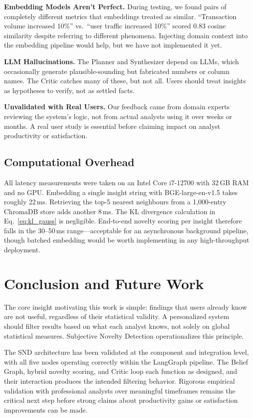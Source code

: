 \documentclass[conference]{IEEEtran}
\begin{document}
\textbf{Embedding Models Aren't Perfect.} During testing, we found pairs
of completely different metrics that embeddings treated as similar.
``Transaction volume increased 10\%'' vs.\ ``user traffic increased
10\%'' scored 0.83 cosine similarity despite referring to different
phenomena. Injecting domain context into the embedding pipeline
would help, but we have not implemented it yet.

\textbf{LLM Hallucinations.} The Planner and Synthesizer depend on LLMs,
which occasionally generate plausible-sounding but fabricated numbers or
column names. The Critic catches many of these, but not all. Users should
treat insights as hypotheses to verify, not as settled facts.

\textbf{Unvalidated with Real Users.} Our feedback came from domain
experts reviewing the system's logic, not from actual analysts using it
over weeks or months. A real user study is essential before claiming
impact on analyst productivity or satisfaction.

\subsection{Computational Overhead}

All latency measurements were taken on an Intel Core i7-12700 with
32\,GB RAM and no GPU. Embedding a single insight string with
BGE-large-en-v1.5 takes roughly 22\,ms. Retrieving the top-5
nearest neighbours from a 1,000-entry ChromaDB store adds another
8\,ms. The KL divergence calculation in Eq.~\eqref{eq:kl_gauss}
is negligible. End-to-end novelty scoring per insight therefore
falls in the 30--50\,ms range---acceptable for an asynchronous
background pipeline, though batched embedding would be worth
implementing in any high-throughput deployment.

\section{Conclusion and Future Work}
\label{sec:conclusion}

The core insight motivating this work is simple: findings that users
already know are not useful, regardless of their statistical validity.
A personalized system should filter results based on what each analyst
knows, not solely on global statistical measures. Subjective Novelty
Detection operationalizes this principle.

The SND architecture has been validated at the component and integration
level, with all five nodes operating correctly within the LangGraph
pipeline. The Belief Graph, hybrid novelty scoring, and Critic loop
each function as designed, and their interaction produces the intended
filtering behavior. Rigorous empirical validation with professional
analysts over meaningful timeframes remains the critical next step
before strong claims about productivity gains or satisfaction
improvements can be made.
\end{document}
